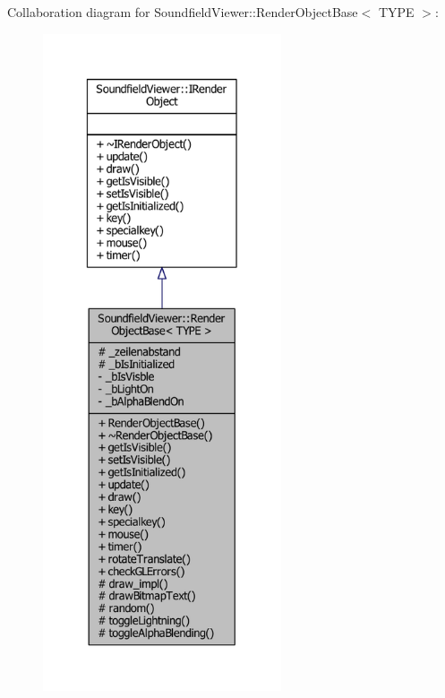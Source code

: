 Collaboration diagram for Soundfield\-Viewer\-:\-:Render\-Object\-Base$<$ T\-Y\-P\-E $>$\-:\nopagebreak
\begin{figure}[H]
\begin{center}
\leavevmode
\includegraphics[height=550pt]{d6/da4/classSoundfieldViewer_1_1RenderObjectBase__coll__graph}
\end{center}
\end{figure}
